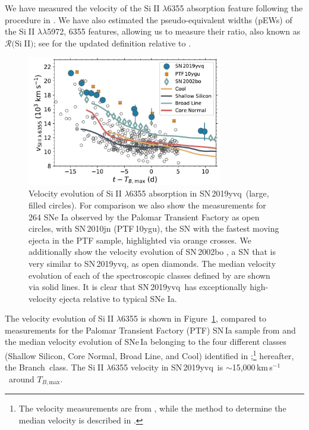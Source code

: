 \documentclass[twocolumn]{aastex63}
\def\ion#1#2{#1$\;${\footnotesize\rm{#2}}\relax}
\newcommand{\tbmax}{$T_{B,\mathrm{max}}$}
\newcommand{\kms}{km\,s$^{-1}$}
\newcommand{\sn}{SN\,2019yvq}
\begin{document}
We have measured the velocity of the \ion{Si}{II} $\lambda$6355 absorption
feature following the procedure in \citet[][see their \S2.5]{Maguire14}. We
have also estimated the pseudo-equivalent widths (pEWs) of the \ion{Si}{II}
$\lambda\lambda$5972, 6355 features, allowing us to measure their ratio, also
known as $\mathcal{R}($\ion{Si}{II}$)$; see \citet{Hachinger08} for the
updated definition relative to \citet{Nugent95}.

\begin{figure}
    \centering
    \includegraphics[width=3.35in]{./figures/vel_evolution.pdf}
    \caption{Velocity evolution of \ion{Si}{II} $\lambda$6355 absorption in
    \sn\ (large, filled circles). For comparison we also show the measurements
    for 264 SNe Ia observed by the Palomar Transient Factory \citep[PTF; data
    from][]{Maguire14} as open circles, with SN\,2010jn (PTF\,10ygu), the SN
    with the fastest moving ejecta in the PTF sample, highlighted via orange
    crosses. We additionally show the velocity evolution of SN\,2002bo
    \citep[data from][]{Benetti04}, a SN that is very similar to \sn, as open
    diamonds. The median velocity evolution of each of the spectroscopic
    classes defined by \citet[][Shallow Silicon, Core Normal, Broad Line, and
    Cool]{Branch06} are shown via solid lines. It is clear that \sn\ has
    exceptionally high-velocity ejecta relative to typical SNe Ia.}
    \label{fig:vel_evo}
\end{figure}

The velocity evolution of \ion{Si}{II} $\lambda$6355 is shown in
Figure~\ref{fig:vel_evo}, compared to measurements for the Palomar Transient
Factory (PTF) SN\,Ia sample from \citet{Maguire14} and the median velocity
evolution of SNe\,Ia belonging to the four different classes (Shallow Silicon,
Core Normal, Broad Line, and Cool) identified in
\citet{Branch06};\footnote{The velocity measurements are from
\citet{Blondin12}, while the method to determine the median velocity is
described in \citet{Miller18}.} hereafter, the Branch~class. The \ion{Si}{II}
$\lambda$6355 velocity in \sn\ is $\sim$15,000\,\kms\ around \tbmax.
\end{document}
